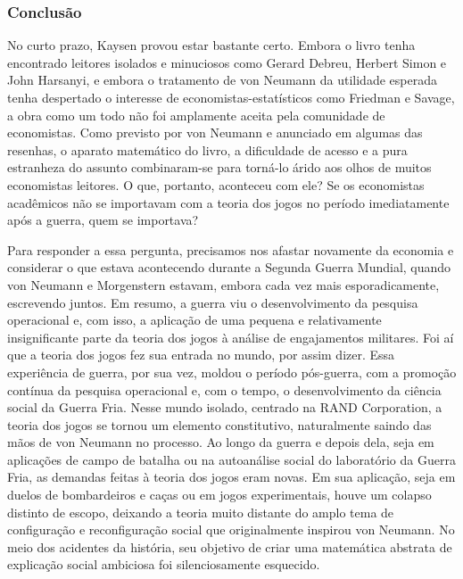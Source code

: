 \documentclass[a4paper,12pt]{article}[abntex2]
\begin{document}
\subsubsection{\textbf{Conclusão}}
No curto prazo, Kaysen provou estar bastante certo. Embora o livro tenha encontrado leitores isolados e minuciosos como Gerard Debreu, Herbert Simon e John Harsanyi, e embora o tratamento de von Neumann da utilidade esperada tenha despertado o interesse de economistas-estatísticos como Friedman e Savage, a obra como um todo não foi amplamente aceita pela comunidade de economistas. Como previsto por von Neumann e anunciado em algumas das resenhas, o aparato matemático do livro, a dificuldade de acesso e a pura estranheza do assunto combinaram-se para torná-lo árido aos olhos de muitos economistas leitores. O que, portanto, aconteceu com ele? Se os economistas acadêmicos não se importavam com a teoria dos jogos no período imediatamente após a guerra, quem se importava?

Para responder a essa pergunta, precisamos nos afastar novamente da economia e considerar o que estava acontecendo durante a Segunda Guerra Mundial, quando von Neumann e Morgenstern estavam, embora cada vez mais esporadicamente, escrevendo juntos. Em resumo, a guerra viu o desenvolvimento da pesquisa operacional e, com isso, a aplicação de uma pequena e relativamente insignificante parte da teoria dos jogos à análise de engajamentos militares. Foi aí que a teoria dos jogos fez sua entrada no mundo, por assim dizer. Essa experiência de guerra, por sua vez, moldou o período pós-guerra, com a promoção contínua da pesquisa operacional e, com o tempo, o desenvolvimento da ciência social da Guerra Fria. Nesse mundo isolado, centrado na RAND Corporation, a teoria dos jogos se tornou um elemento constitutivo, naturalmente saindo das mãos de von Neumann no processo. Ao longo da guerra e depois dela, seja em aplicações de campo de batalha ou na autoanálise social do laboratório da Guerra Fria, as demandas feitas à teoria dos jogos eram novas. Em sua aplicação, seja em duelos de bombardeiros e caças ou em jogos experimentais, houve um colapso distinto de escopo, deixando a teoria muito distante do amplo tema de configuração e reconfiguração social que originalmente inspirou von Neumann. No meio dos acidentes da história, seu objetivo de criar uma matemática abstrata de explicação social ambiciosa foi silenciosamente esquecido.
\end{document}
